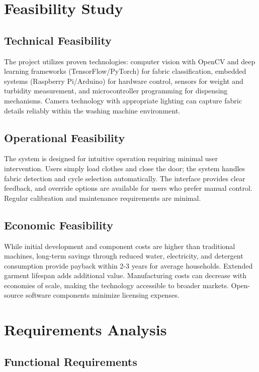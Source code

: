 \section{Feasibility Study}

\subsection{Technical Feasibility}
The project utilizes proven technologies: computer vision with OpenCV and deep learning frameworks (TensorFlow/PyTorch) for fabric classification, embedded systems (Raspberry Pi/Arduino) for hardware control, sensors for weight and turbidity measurement, and microcontroller programming for dispensing mechanisms. Camera technology with appropriate lighting can capture fabric details reliably within the washing machine environment.

\subsection{Operational Feasibility}
The system is designed for intuitive operation requiring minimal user intervention. Users simply load clothes and close the door; the system handles fabric detection and cycle selection automatically. The interface provides clear feedback, and override options are available for users who prefer manual control. Regular calibration and maintenance requirements are minimal.

\subsection{Economic Feasibility}
While initial development and component costs are higher than traditional machines, long-term savings through reduced water, electricity, and detergent consumption provide payback within 2-3 years for average households. Extended garment lifespan adds additional value. Manufacturing costs can decrease with economies of scale, making the technology accessible to broader markets. Open-source software components minimize licensing expenses.

\section{Requirements Analysis}

\subsection{Functional Requirements}

